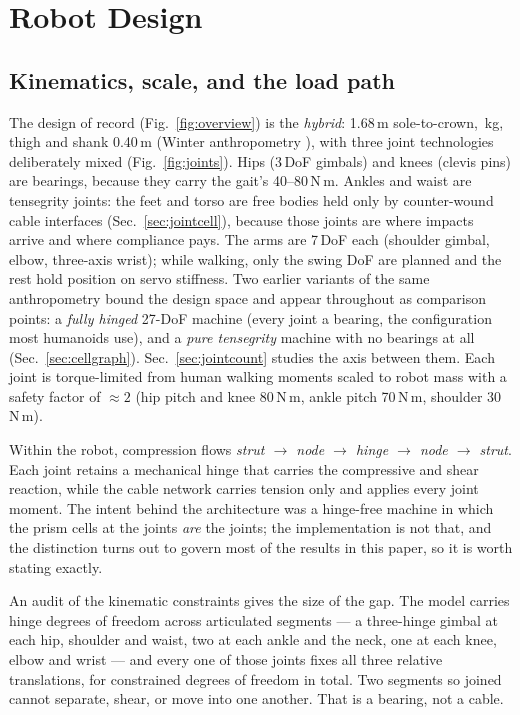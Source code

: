 \documentclass[conference]{IEEEtran}
\begin{document}
\section{Robot Design}
\label{sec:design}

\subsection{Kinematics, scale, and the load path}
The design of record (Fig.~\ref{fig:overview}) is the \emph{hybrid}:
1.68\,m sole-to-crown, \hybridMass\,kg, thigh and shank 0.40\,m (Winter
anthropometry \cite{winter2009biomechanics}), with three joint technologies
deliberately mixed (Fig.~\ref{fig:joints}). Hips (3\,DoF gimbals) and knees
(clevis pins) are bearings, because they carry the gait's 40--80\,N\,m.
Ankles and waist are tensegrity joints: the feet and torso are free bodies
held only by counter-wound cable interfaces (Sec.~\ref{sec:jointcell}),
because those joints are where impacts arrive and where compliance pays. The
arms are 7\,DoF each (shoulder gimbal, elbow, three-axis wrist); while
walking, only the swing DoF are planned and the rest hold position on servo
stiffness. Two earlier variants of the same anthropometry bound the design
space and appear throughout as comparison points: a \emph{fully hinged}
27-DoF machine (every joint a bearing, the configuration most humanoids use),
and a \emph{pure tensegrity} machine with no bearings at all
(Sec.~\ref{sec:cellgraph}). Sec.~\ref{sec:jointcount} studies the axis
between them. Each joint is
torque-limited from human walking moments scaled to robot mass with a safety
factor of $\approx2$ (hip pitch and knee 80\,N\,m, ankle pitch 70\,N\,m,
shoulder 30\,N\,m).

Within the robot, compression flows \emph{strut $\rightarrow$ node
$\rightarrow$ hinge $\rightarrow$ node $\rightarrow$ strut}. Each joint
retains a mechanical hinge that carries the compressive and shear reaction,
while the cable network carries tension only and applies every joint moment.
The intent behind the architecture was a hinge-free machine in which the prism
cells at the joints \emph{are} the joints; the implementation is not that, and
the distinction turns out to govern most of the results in this paper, so it
is worth stating exactly.

An audit of the kinematic constraints gives the size of the gap. The model
carries \hingeDof{} hinge degrees of freedom across \hingeSegments{}
articulated segments --- a three-hinge gimbal at each hip, shoulder and waist,
two at each ankle and the neck, one at each knee, elbow and wrist ---
and every one of those joints fixes all three relative translations, for
\hingeConstrainedDof{} constrained degrees of freedom in total. Two segments
so joined cannot separate, shear, or move into one another. That is a bearing,
not a cable.
\end{document}

